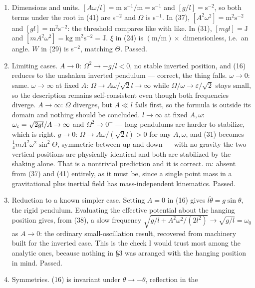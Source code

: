 \documentclass[11pt,a4paper]{article}
\begin{document}
\begin{enumerate}
\def\labelenumi{\arabic{enumi}.}
\item
  Dimensions and units. \([A\omega/l]=\text{m s}^{-1}/\text{m}=\text{s}^{-1}\)
  and \([g/l]=\text{s}^{-2}\), so both terms under the root in (41) are s\(^{-2}\) and
  \(\Omega\) is s\(^{-1}\). In (37), \([A^2\omega^2]=\text{m}^2\text{s}^{-2}\) and
  \([gl]=\text{m}^2\text{s}^{-2}\): the threshold compares like with like. In (31),
  \([mgl]=\text{J}\) and \([mA^2\omega^2]=\text{kg m}^2\text{s}^{-2}=\text{J}\). \(\xi\)
  in (24) is \((\text{m}/\text{m})\times\) dimensionless, i.e.~an angle. \(W\) in (29)
  is s\(^{-2}\), matching \(\ddot\Theta\). Passed.
\item
  Limiting cases. \(A\to0\): \(\Omega^2\to-g/l<0\), no stable inverted
  position, and (16) reduces to the unshaken inverted pendulum --- correct, the
  thing falls. \(\omega\to0\): same. \(\omega\to\infty\) at fixed \(A\): \(\Omega\to A\omega/\sqrt2 l\to\infty\) while \(\Omega/\omega\to\varepsilon/\sqrt2\) stays
  small, so the description remains self-consistent even though both frequencies
  diverge. \(A\to\infty\): \(\Omega\) diverges, but \(A\ll l\) fails first, so the
  formula is outside its domain and nothing should be concluded. \(l\to\infty\) at
  fixed \(A,\omega\): \(\omega_{\rm c}=\sqrt{2gl}/A\to\infty\) and \(\Omega^2\to0^-\) ---
  long pendulums are harder to stabilize, which is right. \(g\to0\): \(\Omega\to A\omega/(\sqrt2 l)>0\) for any \(A,\omega\), and (31) becomes
  \(\tfrac14 mA^2\omega^2\sin^2\Theta\), symmetric between up and down --- with no
  gravity the two vertical positions are physically identical and both are
  stabilized by the shaking alone. That is a nontrivial prediction and it is
  correct. \(m\): absent from (37) and (41) entirely, as it must be, since a single
  point mass in a gravitational plus inertial field has mass-independent
  kinematics. Passed.
\item
  Reduction to a known simpler case. Setting \(A=0\) in (16) gives
  \(l\ddot\theta=g\sin\theta\), the rigid pendulum. Evaluating the effective
  potential about the hanging position gives, from (38), a slow frequency
  \(\sqrt{g/l+A^2\omega^2/(2l^2)}\to\sqrt{g/l}=\omega_0\) as \(A\to0\): the ordinary
  small-oscillation result, recovered from machinery built for the inverted case.
  This is the check I would trust most among the analytic ones, because nothing in
  §3 was arranged with the hanging position in mind. Passed.
\item
  Symmetries. (16) is invariant under \(\theta\to-\theta\), reflection in the

\end{enumerate}
\end{document}
